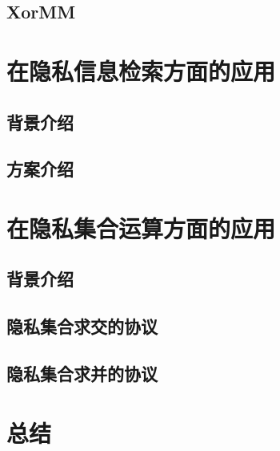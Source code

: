 
\subsection{XorMM}

\section{在隐私信息检索方面的应用}

\subsection{背景介绍}


\subsection{方案介绍}

\section{在隐私集合运算方面的应用}

\subsection{背景介绍}

\subsection{隐私集合求交的协议}

\subsection{隐私集合求并的协议}

\section{总结}
